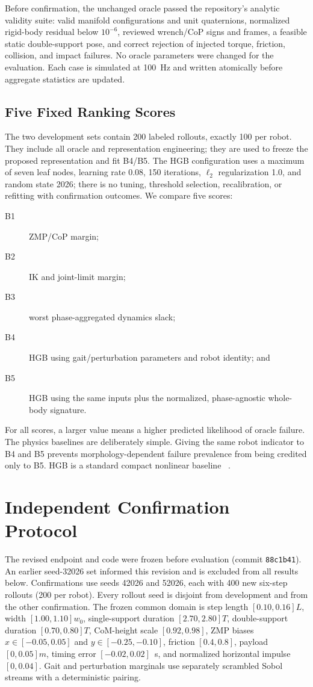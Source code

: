 \documentclass[letterpaper,10pt,conference]{IEEEtran}
\begin{document}
Before confirmation, the unchanged oracle passed the repository's
analytic validity suite: valid manifold configurations and unit quaternions,
normalized rigid-body residual below $10^{-6}$, reviewed wrench/CoP signs and
frames, a feasible static double-support pose, and correct rejection of injected
torque, friction, collision, and impact failures. No oracle parameters were
changed for the evaluation. Each case is simulated at 100~Hz and written
atomically before aggregate statistics are updated.

\subsection{Five Fixed Ranking Scores}
The two development sets contain 200 labeled rollouts, exactly 100 per robot.
They include all oracle and representation engineering; they are used to freeze
the proposed representation and fit B4/B5. The HGB configuration uses a
maximum of seven leaf nodes, learning rate
0.08, 150 iterations, $\ell_2$ regularization 1.0, and random state 2026; there
is no tuning, threshold selection, recalibration, or refitting with confirmation
outcomes. We compare five scores:
\begin{description}
  \item[B1] ZMP/CoP margin;
  \item[B2] IK and joint-limit margin;
  \item[B3] worst phase-aggregated dynamics slack;
  \item[B4] HGB using gait/perturbation parameters and robot identity; and
  \item[B5] HGB using the same inputs plus the normalized, phase-agnostic
  whole-body signature.
\end{description}
For all scores, a larger value means a higher predicted likelihood of oracle
failure. The physics baselines are deliberately simple. Giving the same robot
indicator to B4 and B5 prevents morphology-dependent failure prevalence from
being credited only to B5. HGB is a standard compact nonlinear baseline
~\cite{friedman2001boosting}.

\section{Independent Confirmation Protocol}
The revised endpoint and code were frozen before evaluation (commit
\texttt{88c1b41}). An earlier seed-32026 set informed this revision and is
excluded from all results below. Confirmations use seeds 42026 and 52026, each
with 400 new six-step rollouts (200 per robot). Every rollout seed is disjoint
from development and from the other confirmation. The frozen common domain is
step length $[0.10,0.16]L$, width $[1.00,1.10]w_0$, single-support duration
$[2.70,2.80]T$, double-support duration $[0.70,0.80]T$, CoM-height scale
$[0.92,0.98]$, ZMP biases $x\in[-0.05,0.05]$ and
$y\in[-0.25,-0.10]$, friction $[0.4,0.8]$, payload $[0,0.05]m$, timing error
$[-0.02,0.02]$~s, and normalized horizontal impulse $[0,0.04]$. Gait and
perturbation marginals use separately scrambled Sobol streams with a
deterministic pairing.
\end{document}
